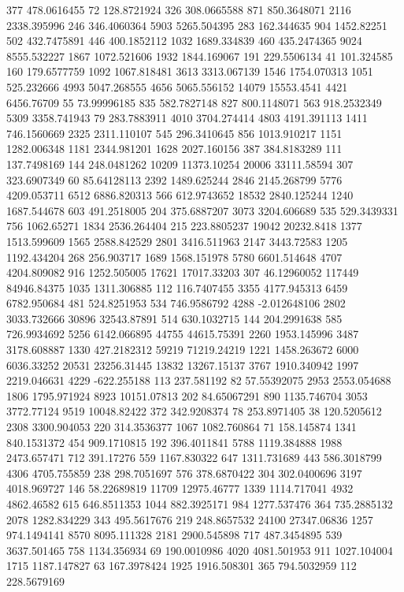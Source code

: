 377	478.0616455
72	128.8721924
326	308.0665588
871	850.3648071
2116	2338.395996
246	346.4060364
5903	5265.504395
283	162.344635
904	1452.82251
502	432.7475891
446	400.1852112
1032	1689.334839
460	435.2474365
9024	8555.532227
1867	1072.521606
1932	1844.169067
191	229.5506134
41	101.324585
160	179.6577759
1092	1067.818481
3613	3313.067139
1546	1754.070313
1051	525.232666
4993	5047.268555
4656	5065.556152
14079	15553.4541
4421	6456.76709
55	73.99996185
835	582.7827148
827	800.1148071
563	918.2532349
5309	3358.741943
79	283.7883911
4010	3704.274414
4803	4191.391113
1411	746.1560669
2325	2311.110107
545	296.3410645
856	1013.910217
1151	1282.006348
1181	2344.981201
1628	2027.160156
387	384.8183289
111	137.7498169
144	248.0481262
10209	11373.10254
20006	33111.58594
307	323.6907349
60	85.64128113
2392	1489.625244
2846	2145.268799
5776	4209.053711
6512	6886.820313
566	612.9743652
18532	2840.125244
1240	1687.544678
603	491.2518005
204	375.6887207
3073	3204.606689
535	529.3439331
756	1062.65271
1834	2536.264404
215	223.8805237
19042	20232.8418
1377	1513.599609
1565	2588.842529
2801	3416.511963
2147	3443.72583
1205	1192.434204
268	256.903717
1689	1568.151978
5780	6601.514648
4707	4204.809082
916	1252.505005
17621	17017.33203
307	46.12960052
117449	84946.84375
1035	1311.306885
112	116.7407455
3355	4177.945313
6459	6782.950684
481	524.8251953
534	746.9586792
4288	-2.012648106
2802	3033.732666
30896	32543.87891
514	630.1032715
144	204.2991638
585	726.9934692
5256	6142.066895
44755	44615.75391
2260	1953.145996
3487	3178.608887
1330	427.2182312
59219	71219.24219
1221	1458.263672
6000	6036.33252
20531	23256.31445
13832	13267.15137
3767	1910.340942
1997	2219.046631
4229	-622.255188
113	237.581192
82	57.55392075
2953	2553.054688
1806	1795.971924
8923	10151.07813
202	84.65067291
890	1135.746704
3053	3772.77124
9519	10048.82422
372	342.9208374
78	253.8971405
38	120.5205612
2308	3300.904053
220	314.3536377
1067	1082.760864
71	158.145874
1341	840.1531372
454	909.1710815
192	396.4011841
5788	1119.384888
1988	2473.657471
712	391.17276
559	1167.830322
647	1311.731689
443	586.3018799
4306	4705.755859
238	298.7051697
576	378.6870422
304	302.0400696
3197	4018.969727
146	58.22689819
11709	12975.46777
1339	1114.717041
4932	4862.46582
615	646.8511353
1044	882.3925171
984	1277.537476
364	735.2885132
2078	1282.834229
343	495.5617676
219	248.8657532
24100	27347.06836
1257	974.1494141
8570	8095.111328
2181	2900.545898
717	487.3454895
539	3637.501465
758	1134.356934
69	190.0010986
4020	4081.501953
911	1027.104004
1715	1187.147827
63	167.3978424
1925	1916.508301
365	794.5032959
112	228.5679169
